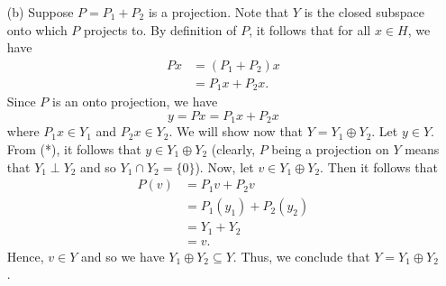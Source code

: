 \begin{enumerate}
    \item[(b)] Suppose \( P = {P}_{1} + {P}_{2} \) is a projection. Note that \( Y  \) is the closed subspace onto which \( P  \) projects to. By definition of \( P  \), it follows that for all \( x \in  H \), we have 
        \begin{align*}
            Px &= ({P}_{1} + {P}_{2})x  \\
               &= {P}_{1}x + {P}_{2}x.
        \end{align*}
        Since \( P  \) is an onto projection, we have 
        \[  y = Px = {P}_{1}x + {P}_{2}x \tag{*} \]
        where \( {P}_{1}x \in {Y}_{1}  \) and \( {P}_{2}x \in {Y}_{2} \). We will show now that \( Y = {Y}_{1} \oplus {Y}_{2} \). Let \( y \in Y  \). From (*), it follows that \( y \in {Y}_{1} \oplus {Y}_{2} \) (clearly, \( P \) being a projection on \( Y  \) means that \( {Y}_{1} \perp {Y}_{2}  \) and so \( {Y}_{1} \cap {Y}_{2} = \{ 0  \}  \)). Now, let \( v \in {Y}_{1} \oplus {Y}_{2} \). Then it follows that 
        \begin{align*}
            P(v) &= {P}_{1}v + {P}_{2}v  \\
                 &= {P}_{1}({y}_{1}) + {P}_{2}({y}_{2}) \\
                 &= {Y}_{1} + {Y}_{2} \\
                 &= v.
        \end{align*}
        Hence, \( v \in Y  \) and so we have \( {Y}_{1} \oplus {Y}_{2} \subseteq  Y  \). Thus, we conclude that \(  Y = {Y}_{1} \oplus {Y}_{2} \).
\end{enumerate}

